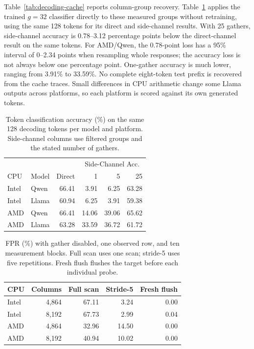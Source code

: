 Table~\ref{tab:decoding-cache} reports column-group recovery.
Table~\ref{tab:decoding-classification} applies the trained $g=32$ classifier directly to these measured groups without retraining, using the same 128 tokens for its direct and side-channel results.
With 25 gathers, side-channel accuracy is 0.78--3.12 percentage points below the direct-channel result on the same tokens.
For AMD/Qwen, the 0.78-point loss has a 95\% interval of 0--2.34 points when resampling whole responses; the accuracy loss is not always below one percentage point.
One-gather accuracy is much lower, ranging from 3.91\% to 33.59\%.
No complete eight-token test prefix is recovered from the cache traces.
Small differences in CPU arithmetic change some Llama outputs across platforms, so each platform is scored against its own generated tokens.

\begin{table}[H]
    \centering\footnotesize\setlength{\tabcolsep}{4pt}
    \caption{Token classification accuracy (\%) on the same 128 decoding tokens per model and platform. Side-channel columns use filtered groups and the stated number of gathers.}
    \label{tab:decoding-classification}
    \begin{tabular}{llrrrr}
        \hline
        & & & \multicolumn{3}{c}{Side-Channel Acc.} \\
        CPU & Model & Direct & 1 & 5 & 25 \\\hline
        Intel & Qwen & 66.41 & 3.91 & 6.25 & 63.28 \\
        Intel & Llama & 60.94 & 6.25 & 3.91 & 59.38 \\
        AMD & Qwen & 66.41 & 14.06 & 39.06 & 65.62 \\
        AMD & Llama & 63.28 & 33.59 & 36.72 & 61.72 \\
        \hline
    \end{tabular}
\end{table}

\begin{table}[H]
    \centering\footnotesize\setlength{\tabcolsep}{4pt}
    \caption{FPR (\%) with gather disabled, one observed row, and ten measurement blocks. Full scan uses one scan; stride-5 uses five repetitions. Fresh flush flushes the target before each individual probe.}
    \label{tab:decoding-no-gather}
    \begin{tabular}{lrrrr}
        \hline
        CPU & Columns & Full scan & Stride-5 & Fresh flush \\\hline
        Intel & 4,864 & 67.11 & 3.24 & 0.00 \\
        Intel & 8,192 & 67.73 & 2.99 & 0.04 \\
        AMD & 4,864 & 32.96 & 14.50 & 0.00 \\
        AMD & 8,192 & 40.94 & 10.02 & 0.00 \\
        \hline
    \end{tabular}
\end{table}


